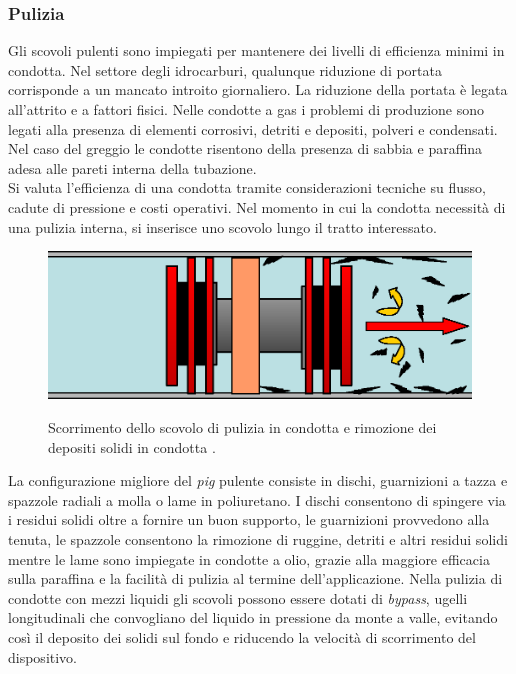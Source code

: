 \subsubsection{Pulizia}
Gli scovoli pulenti sono impiegati per mantenere dei livelli di efficienza minimi in condotta. Nel settore degli idrocarburi, qualunque riduzione di portata corrisponde a un mancato introito giornaliero. La riduzione della portata è legata all'attrito e a fattori fisici. Nelle condotte a gas i problemi di produzione sono legati alla presenza di elementi corrosivi, detriti e depositi, polveri e condensati. Nel caso del greggio le condotte risentono della presenza di sabbia e paraffina adesa alle pareti interna della tubazione.\\
Si valuta l'efficienza di una condotta tramite considerazioni tecniche su flusso, cadute di pressione e costi operativi. Nel momento in cui la condotta necessità di una pulizia interna, si inserisce uno scovolo  lungo il tratto interessato.\\
\begin{figure}[htbp]
	\centering
	\includegraphics[width=.7\textwidth]{fig/pig/cleaning.eps}
	\label{fig:cleaningpig}
	\caption{Scorrimento dello scovolo di pulizia in condotta e rimozione dei depositi solidi in condotta \parencite{davidson2002introduction}.}
\end{figure}
La configurazione migliore del \textit{pig} pulente consiste in dischi, guarnizioni a tazza e spazzole radiali a molla o lame in poliuretano. I dischi consentono di spingere via i residui solidi oltre a fornire un buon supporto, le guarnizioni provvedono alla tenuta, le spazzole consentono la rimozione di ruggine, detriti e altri residui solidi mentre le lame sono impiegate in condotte a olio, grazie alla maggiore efficacia sulla paraffina e la facilità di pulizia al termine dell'applicazione. Nella pulizia di condotte con mezzi liquidi gli scovoli possono essere dotati di \textit{bypass}, ugelli longitudinali che convogliano del liquido in pressione da monte a valle, evitando così il deposito dei solidi sul fondo e riducendo la velocità di scorrimento del dispositivo.


